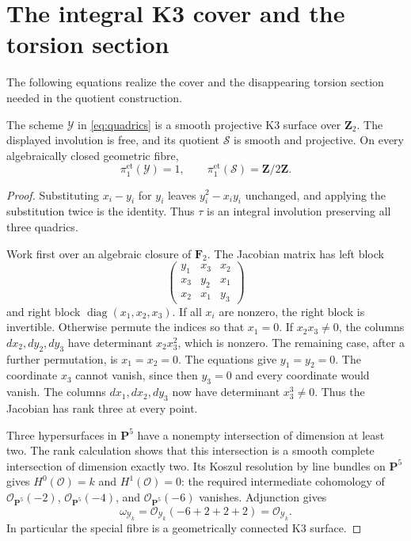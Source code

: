 \documentclass[11pt]{article}
\newcommand{\OO}{\mathcal O}\newcommand{\ZZ}{\mathbf Z}
\newcommand{\FF}{\mathbf F}\newcommand{\PP}{\mathbf P}
\newcommand{\et}{\mathrm{et}}\newcommand{\crys}{\mathrm{crys}}
\theoremstyle{definition}\newtheorem{definition}[theorem]{Definition}
\theoremstyle{remark}\newtheorem{remark}[theorem]{Remark}
\begin{document}
\section{The integral K3 cover and the torsion section}

The following equations realize the cover and the disappearing torsion section needed in the quotient construction.

\begin{lemma}\label{lem:k3}
The scheme $\mathcal Y$ in \eqref{eq:quadrics} is a smooth projective K3 surface over $\ZZ_2$. The displayed involution is free, and its quotient $\mathcal S$ is smooth and projective. On every algebraically closed geometric fibre,
\[
 \pi_1^{\et}(\mathcal Y)=1,\qquad
 \pi_1^{\et}(\mathcal S)=\ZZ/2\ZZ.
\]
\end{lemma}
\begin{proof}
Substituting $x_i-y_i$ for $y_i$ leaves $y_i^2-x_iy_i$ unchanged, and applying the substitution twice is the identity. Thus $\tau$ is an integral involution preserving all three quadrics.

Work first over an algebraic closure of $\FF_2$. The Jacobian matrix has left block
\[
 \begin{pmatrix}
 y_1&x_3&x_2\\
 x_3&y_2&x_1\\
 x_2&x_1&y_3
 \end{pmatrix}
\]
and right block $\operatorname{diag}(x_1,x_2,x_3)$. If all $x_i$ are nonzero, the right block is invertible. Otherwise permute the indices so that $x_1=0$. If $x_2x_3\ne0$, the columns $dx_2,dy_2,dy_3$ have determinant $x_2x_3^2$, which is nonzero. The remaining case, after a further permutation, is $x_1=x_2=0$. The equations give $y_1=y_2=0$. The coordinate $x_3$ cannot vanish, since then $y_3=0$ and every coordinate would vanish. The columns $dx_1,dx_2,dy_3$ now have determinant $x_3^3\ne0$. Thus the Jacobian has rank three at every point.

Three hypersurfaces in $\PP^5$ have a nonempty intersection of dimension at least two. The rank calculation shows that this intersection is a smooth complete intersection of dimension exactly two. Its Koszul resolution by line bundles on $\PP^5$ gives $H^0(\OO)=k$ and $H^1(\OO)=0$: the required intermediate cohomology of $\OO_{\PP^5}(-2)$, $\OO_{\PP^5}(-4)$, and $\OO_{\PP^5}(-6)$ vanishes. Adjunction gives
\[
 \omega_{\mathcal Y_k}=\OO_{\mathcal Y_k}(-6+2+2+2)=\OO_{\mathcal Y_k}.
\]
In particular the special fibre is a geometrically connected K3 surface.


\end{proof}
\end{document}
